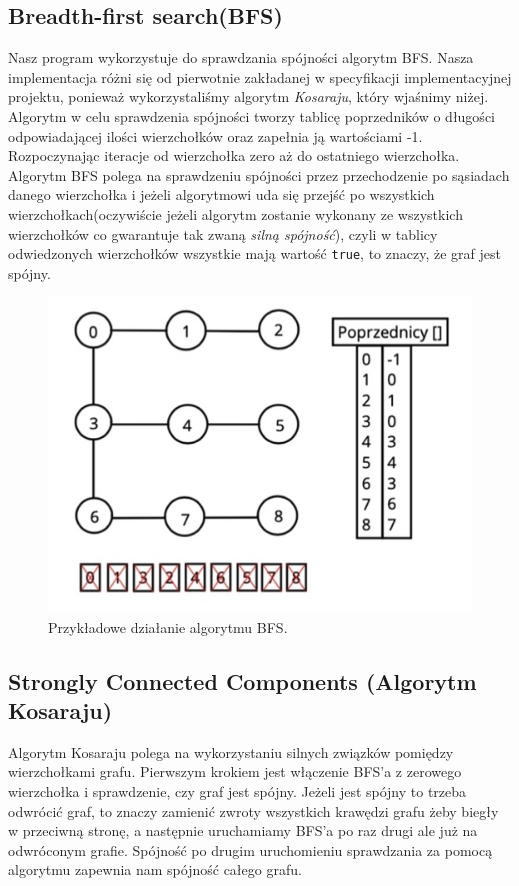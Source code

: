 \documentclass[10pt, a4paper]{report}
\begin{document}
\subsection{Breadth-first search(BFS)}\label{subsec:breadth-first-search(bfs)}
Nasz program wykorzystuje do sprawdzania spójności algorytm BFS. Nasza
implementacja różni się od pierwotnie zakładanej w specyfikacji
implementacyjnej
projektu, ponieważ wykorzystaliśmy algorytm \textit{Kosaraju}, który wjaśnimy
niżej.
Algorytm w celu sprawdzenia spójności tworzy tablicę poprzedników o długości
odpowiadającej ilości wierzchołków
oraz zapełnia ją wartościami -1. Rozpoczynając iteracje od wierzchołka zero aż
do ostatniego wierzchołka.
Algorytm BFS polega na sprawdzeniu spójności przez przechodzenie po sąsiadach
danego wierzchołka i jeżeli algorytmowi uda się
przejść po wszystkich wierzchołkach(oczywiście jeżeli algorytm zostanie
wykonany ze wszystkich wierzchołków co gwarantuje tak zwaną \textit{silną
  spójność}), czyli w tablicy odwiedzonych wierzchołków wszystkie mają wartość
\texttt{true}, to znaczy, że graf jest spójny.
\begin{figure}[h]
  \begin{center}
    \includegraphics[scale=0.5]{bfs.png}
    \caption{Przykładowe działanie algorytmu BFS.}
  \end{center}
\end{figure}
\newpage

\subsection{Strongly Connected Components (Algorytm Kosaraju)}\label{subsec:kosaraju}
Algorytm Kosaraju polega na wykorzystaniu silnych związków pomiędzy
wierzchołkami grafu. Pierwszym krokiem jest włączenie BFS'a z zerowego
wierzchołka i sprawdzenie, czy graf jest spójny.
Jeżeli jest spójny to trzeba odwrócić graf, to znaczy zamienić zwroty
wszystkich krawędzi grafu żeby biegły w przeciwną stronę, a następnie
uruchamiamy BFS'a po raz drugi ale już na odwróconym grafie.
Spójność po drugim uruchomieniu sprawdzania za pomocą algorytmu zapewnia nam
spójność całego grafu.
\end{document}
